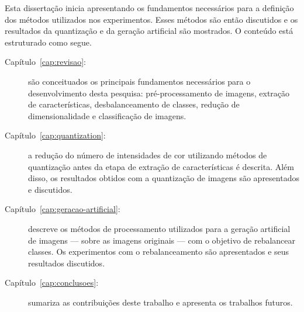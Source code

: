 Esta dissertação inicia apresentando os fundamentos necessários para a definição dos métodos utilizados nos experimentos. Esses métodos são então discutidos e os resultados da quantização e da geração artificial são mostrados. O conteúdo está estruturado como segue.

\begin{description}
\item [Capítulo~\ref{cap:revisao}:] são conceituados os principais fundamentos necessários para o desenvolvimento desta pesquisa: pré-processamento de imagens, extração de características, desbalanceamento de classes, redução de dimensionalidade e classificação de imagens.

\item [Capítulo~\ref{cap:quantization}:] a redução do número de intensidades de cor utilizando métodos de quantização antes da etapa de extração de características é descrita. Além disso, os resultados obtidos com a quantização de imagens são apresentados e discutidos.

\item [Capítulo~\ref{cap:geracao-artificial}:] descreve os métodos de processamento utilizados para a geração artificial de imagens --- sobre as imagens originais --- com o objetivo de rebalancear classes. Os experimentos com o rebalanceamento são apresentados e seus resultados discutidos.

\item [Capítulo~\ref{cap:conclusoes}:] sumariza as contribuições deste trabalho e apresenta os trabalhos futuros.

\end{description}
